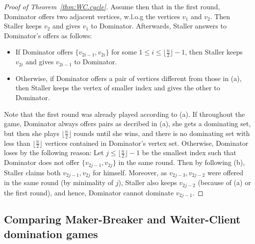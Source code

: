 \documentclass[reqno, 12pt]{amsart}
\numberwithin{equation}{section}
\numberwithin{figure}{section}
\begin{document}
\begin{proof}[Proof of Theorem~\ref{thm:WC.cycle}]
Assume then that in the first round, 
Dominator offers two adjacent vertices, w.l.o.g the vertices $v_{1}$ and $v_2$. Then Staller keeps $v_2$ and gives $v_{1}$ to Dominator. Afterwards, Staller answers to Dominator's offers as follows:
\begin{itemize}
    \item[(a)] If Dominator offers $\{v_{2i-1},v_{2i}\}$ for some
    $1\leq i\leq \lfloor \frac{n}{2} \rfloor - 1$, then Staller keeps $v_{2i}$ and gives $v_{2i-1}$ to Dominator.
    \item[(b)] Otherwise, if Dominator offers a pair of vertices different from those in (a), then Staller keeps the vertex of smaller index and gives the other to Dominator. 
\end{itemize}

Note that the first round was already played according to (a).
If throughout the game, Dominator always offers pairs as decribed in (a), she gets a dominating set, but then she plays $\lfloor \frac{n}{2} \rfloor$ rounds until she wins, and there is no dominating set with less
than $\lfloor \frac{n}{2} \rfloor$ vertices contained in Dominator's vertex set.
Otherwise, Dominator loses by the following reason:
Let $j\leq \lfloor \frac{n}{2} \rfloor - 1$ be the smallest index such that Dominator does not offer 
$\{v_{2j-1},v_{2j}\}$ in the same round. Then by following (b),
Staller claims both $v_{2j-1},v_{2j}$ for himself.
Moreover, as $v_{2j-3},v_{2j-2}$ 
were offered in the same round (by minimality of $j$), 
Staller also keeps $v_{2j-2}$ (because of (a) or the first round),
and hence, Dominator cannot dominate $v_{2j-1}$.
\end{proof}

\newpage

\subsection{Comparing Maker-Breaker and Waiter-Client domination games}
\end{document}
